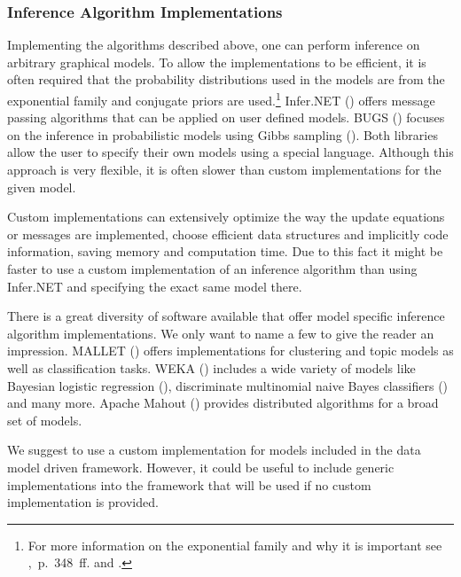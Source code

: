 \subsubsection{Inference Algorithm Implementations}
\label{subsec:custom-inference}

Implementing the algorithms described above, one can perform inference on arbitrary graphical models. To allow the implementations to be efficient, it is often required that the probability distributions used in the models are from the exponential family and conjugate priors are used.\footnote{For more information on the exponential family and why it is important see \textcite{murphy2012machine},~p.~348~ff. and \textcite{andersen1970sufficiency}.} Infer.NET (\cite{InferNET12}) offers message passing algorithms that can be applied on user defined models. BUGS (\cite{lunn2009bugs}) focuses on the inference in probabilistic models using Gibbs sampling (\cite{geman1984stochastic}). Both libraries allow the user to specify their own models using a special language. Although this approach is very flexible, it is often slower than custom implementations for the given model.

Custom implementations can extensively optimize the way the update equations or messages are implemented, choose efficient data structures and implicitly code information, saving memory and computation time. Due to this fact it might be faster to use a custom implementation of an inference algorithm than using Infer.NET and specifying the exact same model there.

There is a great diversity of software available that offer model specific inference algorithm implementations. We only want to name a few to give the reader an impression. MALLET (\cite{mccallum2002mallet}) offers implementations for clustering and topic models as well as classification tasks. WEKA (\cite{hall2009weka}) includes a wide variety of models like Bayesian logistic regression (\cite{genkin2007large}), discriminate multinomial naive Bayes classifiers (\cite{talia2005weka4ws}) and many more. Apache Mahout (\cite{mahout}) provides distributed algorithms for a broad set of models.

We suggest to use a custom implementation for models included in the data model driven framework. However, it could be useful to include generic implementations into the framework that will be used if no custom implementation is provided.
